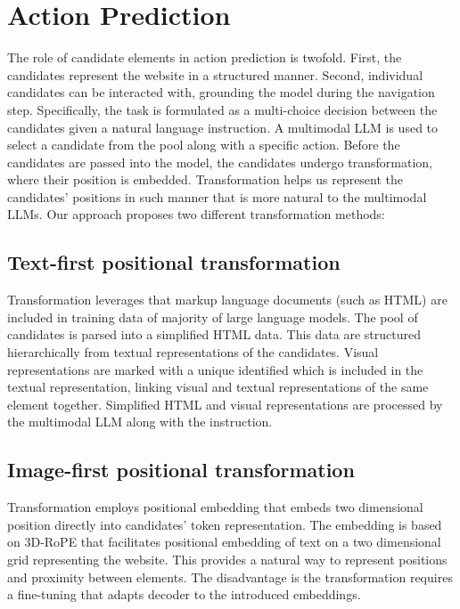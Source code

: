 \section{Action Prediction}\label{section:prediction}
The role of candidate elements in action prediction is twofold. First, the candidates represent the website in a structured manner. Second, individual candidates can be interacted with, grounding the model during the navigation step. Specifically, the task is formulated as a multi-choice decision between the candidates given a natural language instruction. A multimodal LLM is used to select a candidate from the pool along with a specific action.
Before the candidates are passed into the model, the candidates undergo transformation, where their position is embedded. Transformation helps us represent the candidates' positions in such manner that is more natural to the multimodal LLMs. Our approach proposes two different transformation methods:

\subsection{Text-first positional transformation}
Transformation leverages that markup language documents (such as HTML) are included in training data of majority of large language models. The pool of candidates is parsed into a simplified HTML data. This data are structured hierarchically from textual representations of the candidates. Visual representations are marked with a unique identified which is included in the textual representation, linking visual and textual representations of the same element together. Simplified HTML and visual representations are processed by the multimodal LLM along with the instruction.

\subsection{Image-first positional transformation}
Transformation employs positional embedding that embeds two dimensional position directly into candidates' token representation. The embedding is based on 3D-RoPE \textcite{ma20243drope} that facilitates positional embedding of text on a two dimensional grid representing the website. This provides a natural way to represent positions and proximity between elements. The disadvantage is the transformation requires a fine-tuning that adapts decoder to the introduced embeddings.

